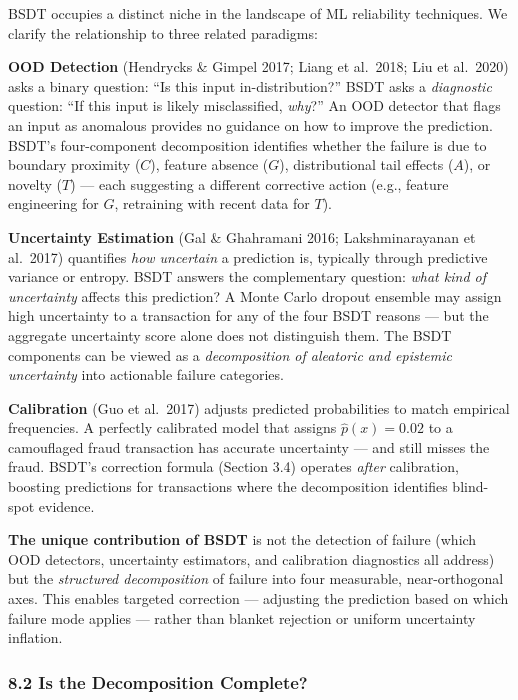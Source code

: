 \documentclass[
  11pt,
]{article}
\begin{document}
BSDT occupies a distinct niche in the landscape of ML reliability
techniques. We clarify the relationship to three related paradigms:

\textbf{OOD Detection} (Hendrycks \& Gimpel 2017; Liang et al.~2018; Liu
et al.~2020) asks a binary question: “Is this input in-distribution?”
BSDT asks a \emph{diagnostic} question: “If this input is likely
misclassified, \emph{why}?” An OOD detector that flags an input as
anomalous provides no guidance on how to improve the prediction. BSDT’s
four-component decomposition identifies whether the failure is due to
boundary proximity (\(C\)), feature absence (\(G\)), distributional tail
effects (\(A\)), or novelty (\(T\)) — each suggesting a different
corrective action (e.g., feature engineering for \(G\), retraining with
recent data for \(T\)).

\textbf{Uncertainty Estimation} (Gal \& Ghahramani 2016;
Lakshminarayanan et al.~2017) quantifies \emph{how uncertain} a
prediction is, typically through predictive variance or entropy. BSDT
answers the complementary question: \emph{what kind of uncertainty}
affects this prediction? A Monte Carlo dropout ensemble may assign high
uncertainty to a transaction for any of the four BSDT reasons — but the
aggregate uncertainty score alone does not distinguish them. The BSDT
components can be viewed as a \emph{decomposition of aleatoric and
epistemic uncertainty} into actionable failure categories.

\textbf{Calibration} (Guo et al.~2017) adjusts predicted probabilities
to match empirical frequencies. A perfectly calibrated model that
assigns \(\hat{p}(x) = 0.02\) to a camouflaged fraud transaction has
accurate uncertainty — and still misses the fraud. BSDT’s correction
formula (Section 3.4) operates \emph{after} calibration, boosting
predictions for transactions where the decomposition identifies
blind-spot evidence.

\textbf{The unique contribution of BSDT} is not the detection of failure
(which OOD detectors, uncertainty estimators, and calibration
diagnostics all address) but the \emph{structured decomposition} of
failure into four measurable, near-orthogonal axes. This enables
targeted correction — adjusting the prediction based on which failure
mode applies — rather than blanket rejection or uniform uncertainty
inflation.

\subsubsection{8.2 Is the Decomposition
Complete?}\label{is-the-decomposition-complete}
\end{document}

